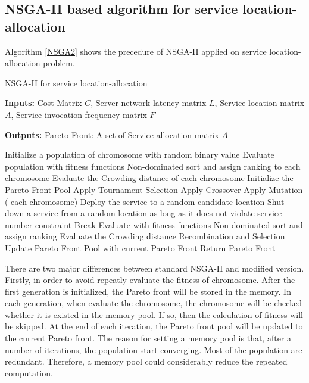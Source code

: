 \documentclass{llncs}
\begin{document}
\subsection{NSGA-II based algorithm for service location-allocation}
Algorithm \ref{NSGA2} shows the precedure of NSGA-II applied on service location-allocation problem.
\begin{algorithm}[htb]
	\caption{NSGA-II for service location-allocation}
	\label{NSGA2}
	\textbf{Inputs:}
		Cost Matrix $C$,
		Server network latency matrix $L$, 
		Service location matrix $A$, 
		Service invocation frequency matrix $F$

	\textbf{Outputs:}
		Pareto Front: A set of Service allocation matrix $A$

	\begin{algorithmic}[1]
		\State Initialize a population of chromosome with random binary value
		\State Evaluate population with fitness functions
		\State Non-dominated sort and assign ranking to each chromosome
		\State Evaluate the Crowding distance of each chromosome
		\State Initialize the Pareto Front Pool
		\State Apply Tournament Selection
		\State Apply Crossover 
		\State Apply Mutation
		\For( each chromosome)
		\State Deploy the service to a random candidate location
		\EndWhile
		\State Shut down a service from a random location as long as it does not violate service number constraint
		\State Break
		\EndIf
		\EndWhile
		\State Evaluate with fitness functions
		\EndIf
		\State Non-dominated sort and assign ranking
		\State Evaluate the Crowding distance
		\EndFor
		\State Recombination and Selection
		\State Update Pareto Front Pool with current Pareto Front
		\EndWhile
		\State Return Pareto Front
	\end{algorithmic}
\end{algorithm}

There are two major differences between standard NSGA-II and modified version. Firstly, in order to avoid repeatly evaluate the fitness
of chromosome. After the first generation is initialized, the Pareto front will be 
stored in the memory. In each generation, when evaluate the chromosome, the chromosome will be checked whether it is existed in the memory pool. 
If so, then the calculation of fitness will be skipped. At the end of each iteration, the Pareto front pool will be updated to the current Pareto front.
The reason for setting a memory pool is that, after a number of iterations, the population start converging. 
Most of the population are redundant. Therefore, a memory pool could considerably reduce the repeated computation.
\end{document}
